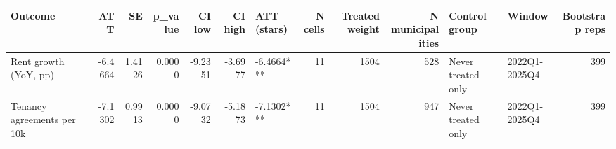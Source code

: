 \begin{tabular}{lrrrrrlrrrllr}
\toprule
Outcome & ATT & SE & p_value & CI low & CI high & ATT (stars) & N cells & Treated weight & N municipalities & Control group & Window & Bootstrap reps \\
\midrule
Rent growth (YoY, pp) & -6.4664 & 1.4126 & 0.0000 & -9.2351 & -3.6977 & -6.4664*** & 11 & 1504 & 528 & Never treated only & 2022Q1-2025Q4 & 399 \\
Tenancy agreements per 10k & -7.1302 & 0.9913 & 0.0000 & -9.0732 & -5.1873 & -7.1302*** & 11 & 1504 & 947 & Never treated only & 2022Q1-2025Q4 & 399 \\
\bottomrule
\end{tabular}
